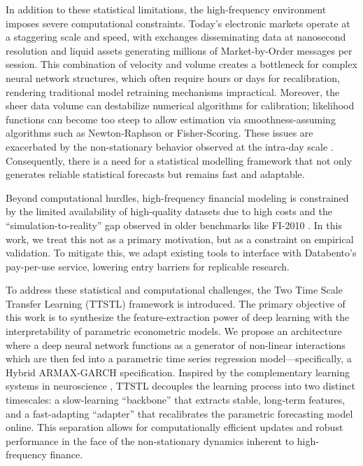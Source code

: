 \documentclass[10pt,a4paper,oneside]{article}
\begin{document}
In addition to these statistical limitations, the high-frequency environment imposes severe computational constraints. Today's electronic markets operate at a staggering scale and speed, with exchanges disseminating data at nanosecond resolution and liquid assets generating millions of Market-by-Order messages per session. This combination of velocity and volume creates a bottleneck for complex neural network structures, which often require hours or days for recalibration, rendering traditional model retraining mechanisms impractical. Moreover, the sheer data volume can destabilize numerical algorithms for calibration; likelihood functions can become too steep to allow estimation via smoothness-assuming algorithms such as Newton-Raphson or Fisher-Scoring. These issues are exacerbated by the non-stationary behavior observed at the intra-day scale \cite{dutta2023review, Vyetrenko2019GetRR}. Consequently, there is a need for a statistical modelling framework that not only generates reliable statistical forecasts but remains fast and adaptable.

Beyond computational hurdles, high-frequency financial modeling is constrained by the limited availability of high-quality datasets due to high costs \cite{KISSELL201447} and the ``simulation-to-reality'' gap observed in older benchmarks like FI-2010 \cite{prata2024lob}. In this work, we treat this not as a primary motivation, but as a constraint on empirical validation. To mitigate this, we adapt existing tools to interface with Databento's pay-per-use service, lowering entry barriers for replicable research.

To address these statistical and computational challenges, the Two Time Scale Transfer Learning (TTSTL) framework is introduced. The primary objective of this work is to synthesize the feature-extraction power of deep learning with the interpretability of parametric econometric models. We propose an architecture where a deep neural network functions as a generator of non-linear interactions which are then fed into a parametric time series regression model—specifically, a Hybrid ARMAX-GARCH specification. Inspired by the complementary learning systems in neuroscience \cite{pham_continual_2024}, TTSTL decouples the learning process into two distinct timescales: a slow-learning ``backbone'' that extracts stable, long-term features, and a fast-adapting ``adapter'' that recalibrates the parametric forecasting model online. This separation allows for computationally efficient updates and robust performance in the face of the non-stationary dynamics inherent to high-frequency finance.
\end{document}
